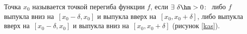 

   Точка $x_0$ называется точкой перегиба функции $f$, если $\exists\  \delta\hm>0\colon$ либо $f$ выпукла вниз на~$[x_0-\delta,x_0]$ и выпукла вверх на~$[x_0,x_0+\delta]$,
    либо выпукла вверх на~$[x_0-\delta,x_0]$ и выпукла вниз на~$[x_0,x_0+\delta]$ (рисунок \ref{kas}).

